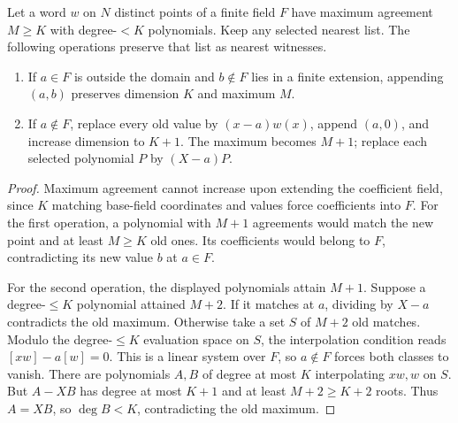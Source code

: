 \begin{lemma}\label{lem:boundary-preserving-padding}
Let a word $w$ on $N$ distinct points of a finite field $F$ have maximum
agreement $M\ge K$ with degree-$<K$ polynomials. Keep any selected nearest
list. The following operations preserve that list as nearest witnesses.
\begin{enumerate}
\item If $a\in F$ is outside the domain and $b\notin F$ lies in a finite
extension, appending $(a,b)$ preserves dimension $K$ and maximum $M$.
\item If $a\notin F$, replace every old value by $(x-a)w(x)$, append
$(a,0)$, and increase dimension to $K+1$. The maximum becomes $M+1$;
replace each selected polynomial $P$ by $(X-a)P$.
\end{enumerate}
\end{lemma}
\begin{proof}
Maximum agreement cannot increase upon extending the coefficient field,
since $K$ matching base-field coordinates and values force coefficients
into $F$. For the first operation, a polynomial with $M+1$ agreements
would match the new point and at least $M\ge K$ old ones. Its coefficients
would belong to $F$, contradicting its new value $b$ at $a\in F$.

For the second operation, the displayed polynomials attain $M+1$.
Suppose a degree-$\le K$ polynomial attained $M+2$. If it matches at $a$,
dividing by $X-a$ contradicts the old maximum. Otherwise take a set $S$
of $M+2$ old matches. Modulo the degree-$\le K$ evaluation space on $S$,
the interpolation condition reads $[xw]-a[w]=0$. This is a linear system
over $F$, so $a\notin F$ forces both classes to vanish. There are
polynomials $A,B$ of degree at most $K$ interpolating $xw,w$ on $S$.
But $A-XB$ has degree at most $K+1$ and at least $M+2\ge K+2$ roots.
Thus $A=XB$, so $\deg B<K$, contradicting the old maximum.
\end{proof}


